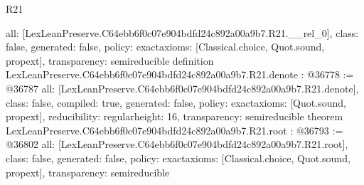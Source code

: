 \begin{lexlean}{R21}
\begin{coremodule}
{  all: [LexLeanPreserve.C64ebb6f0c07e904bdfd24c892a00a9b7.R21.__rel_0],
  class: false,
  generated: false,
  policy: exact{axioms: [Classical.choice, Quot.sound, propext]},
  transparency: semireducible
}
definition LexLeanPreserve.C64ebb6f0c07e904bdfd24c892a00a9b7.R21.denote : @36778 := @36787 {
  all: [LexLeanPreserve.C64ebb6f0c07e904bdfd24c892a00a9b7.R21.denote],
  class: false,
  compiled: true,
  generated: false,
  policy: exact{axioms: [Quot.sound, propext]},
  reducibility: regular{height: 16},
  transparency: semireducible
}
theorem LexLeanPreserve.C64ebb6f0c07e904bdfd24c892a00a9b7.R21.root : @36793 := @36802 {
  all: [LexLeanPreserve.C64ebb6f0c07e904bdfd24c892a00a9b7.R21.root],
  class: false,
  generated: false,
  policy: exact{axioms: [Classical.choice, Quot.sound, propext]},
  transparency: semireducible
}


\end{coremodule}
\end{lexlean}

